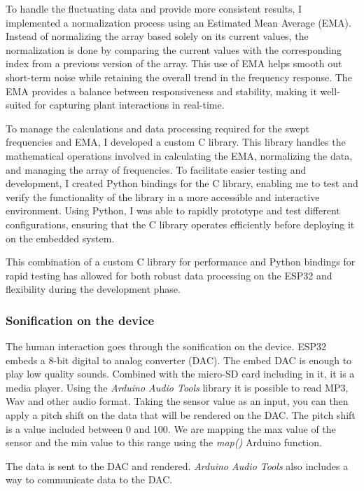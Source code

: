 To handle the fluctuating data and provide more consistent results, I implemented a normalization process using an Estimated Mean Average (EMA). Instead of normalizing the array based solely on its current values, the normalization is done by comparing the current values with the corresponding index from a previous version of the array. This use of EMA helps smooth out short-term noise while retaining the overall trend in the frequency response. The EMA provides a balance between responsiveness and stability, making it well-suited for capturing plant interactions in real-time.

To manage the calculations and data processing required for the swept frequencies and EMA, I developed a custom C library. This library handles the mathematical operations involved in calculating the EMA, normalizing the data, and managing the array of frequencies. To facilitate easier testing and development, I created Python bindings for the C library, enabling me to test and verify the functionality of the library in a more accessible and interactive environment. Using Python, I was able to rapidly prototype and test different configurations, ensuring that the C library operates efficiently before deploying it on the embedded system.

This combination of a custom C library for performance and Python bindings for rapid testing has allowed for both robust data processing on the ESP32 and flexibility during the development phase.


\subsubsection{Sonification on the device}

The human interaction goes through the sonification on the device. ESP32 embeds a 8-bit digital to analog converter (DAC).
The embed DAC is enough to play low quality sounds. Combined with the micro-SD card including in it, it is a media player.
Using the \textit{Arduino Audio Tools} library it is possible to read MP3, Wav and other audio format.
Taking the sensor value as an input, you can then apply a pitch shift on the data that will be rendered on the DAC.
The pitch shift is a value included between 0 and 100. We are mapping the max value of the sensor and the min value
to this range using the \textit{map()} Arduino function.

The data is sent to the DAC and rendered. \textit{Arduino Audio Tools} also includes a way to communicate data to the
DAC.


